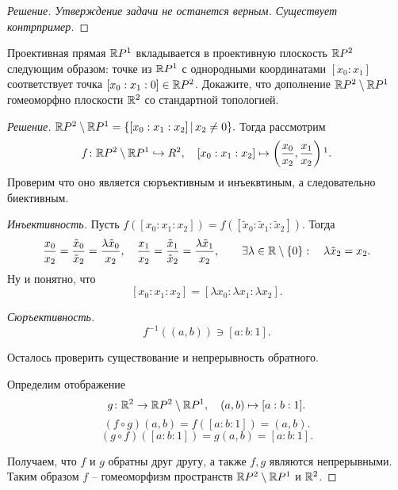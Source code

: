 \documentclass[10pt]{article}
\begin{document}
\begin{tasks}
\begin{proof}[Решение]
		\textit{Утверждение задачи не останется верным. Существует контрпример.}
	\end{proof}
	
	 \item Проективная прямая $\mathbb R P^1$ вкладывается в проективную плоскость $\mathbb R P^2$ следующим образом: точке из $\mathbb R P^1$ с однородными координатами $[x_0:x_1]$ соответствует точка $[x_0:x_1:0]\in \mathbb R P^2$. Докажите, что дополнение $\mathbb R P^2\setminus \mathbb R P^1$ гомеоморфно плоскости $\mathbb R^2$ со стандартной топологией.
	
	\begin{proof}
		[Решение] 
		$\mathbb R P^2 \setminus \mathbb R P^1 = \{[x_0:x_1:x_2]\,|\, x_2 \neq 0\}.$ Тогда рассмотрим $$f \colon \R P^2 \setminus \R P^1 \hookrightarrow R^2, \quad [x_0:x_1:x_2] \mapsto \left( \frac{x_0}{x_2}, \frac{x_1}{x_2}\right)\footnotemark.$$
		Проверим что оно является сюръективным и инъеквтиным, а следовательно биективным.
		\begin{conditions}
			\item \textit{Инъективность.} Пусть $f([x_0:x_1:x_2]) = f([\tilde x_0 : \tilde x_1 : \tilde x_2])$. Тогда \[\frac{x_0}{x_2} = \frac{\tilde x_0}{\tilde x_2} = \frac{\lambda \tilde x_0}{x_2}, \quad \frac{x_1}{x_2} = \frac{\tilde x_1}{\tilde x_2}  = \frac{\lambda \tilde x_1}{x_2},\qquad \exists \lambda \in \mathbb R\setminus\{0\}: \quad \lambda \tilde x_2 = x_2.\]
			Ну и понятно, что \[[x_0: x_1:x_2] = [\lambda x_0:\lambda x_1 :\lambda x_2].\]
			\item \textit{Сюръективность.} \[f^{-1}((a, b)) \ni [a : b : 1].\]
		\end{conditions}
		Осталось проверить существование и непрерывность обратного.
		
		Определим отображение $$g \colon \mathbb R^2 \to \mathbb R P^2 \setminus \mathbb R P^1, \quad (a,b) \mapsto [a:b:1].$$
		\[(f\circ g)(a,b) = f([a:b:1]) = (a,b).\]
		\[(g\circ f)([a:b:1]) = g(a,b) = [a:b:1].\]
		
		Получаем, что $f$ и $g$ обратны друг другу, а также $f, g$ являются непрерывными. Таким образом $f$ -- гомеоморфизм пространств $\mathbb R P^2 \setminus \mathbb R P^1$ и $\mathbb R^2$. 

	\end{proof}
	
\end{tasks}
\end{document}
